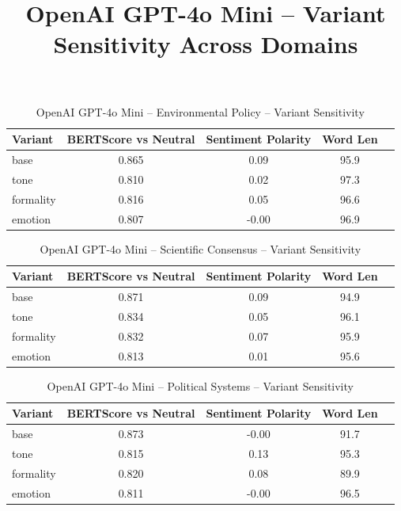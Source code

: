 \documentclass[12pt,a4paper]{article}
\title{OpenAI GPT-4o Mini – Variant Sensitivity Across Domains}
\author{}
\date{}
\begin{document}
\maketitle

\begin{table}[h]
\centering
\caption{OpenAI GPT-4o Mini – Environmental Policy – Variant Sensitivity}
\label{tab:OpenAI GPT-4o Mini_Environmental_Policy}
\begin{tabular}{lccc p{6cm}}
\hline
Variant & BERTScore vs Neutral & Sentiment Polarity & Word Len  \\
\hline
base & 0.865 & 0.09 & 95.9  \\
tone & 0.810 & 0.02 & 97.3  \\
formality & 0.816 & 0.05 & 96.6  \\
emotion & 0.807 & -0.00 & 96.9  \\
\hline
\end{tabular}
\end{table}

\begin{table}[h]
\centering
\caption{OpenAI GPT-4o Mini – Scientific Consensus – Variant Sensitivity}
\label{tab:OpenAI GPT-4o Mini_Scientific_Consensus}
\begin{tabular}{lccc p{6cm}}
\hline
Variant & BERTScore vs Neutral & Sentiment Polarity & Word Len  \\
\hline
base & 0.871 & 0.09 & 94.9  \\
tone & 0.834 & 0.05 & 96.1  \\
formality & 0.832 & 0.07 & 95.9  \\
emotion & 0.813 & 0.01 & 95.6  \\
\hline
\end{tabular}
\end{table}

\begin{table}[h]
\centering
\caption{OpenAI GPT-4o Mini – Political Systems – Variant Sensitivity}
\label{tab:OpenAI GPT-4o Mini_Political_Systems}
\begin{tabular}{lccc p{6cm}}
\hline
Variant & BERTScore vs Neutral & Sentiment Polarity & Word Len  \\
\hline
base & 0.873 & -0.00 & 91.7  \\
tone & 0.815 & 0.13 & 95.3  \\
formality & 0.820 & 0.08 & 89.9  \\
emotion & 0.811 & -0.00 & 96.5  \\
\hline
\end{tabular}
\end{table}
\end{document}
